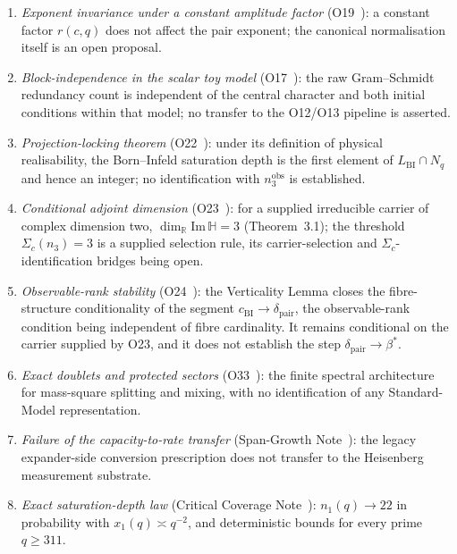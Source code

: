 \documentclass[11pt,a4paper]{article}
\theoremstyle{definition}
\renewcommand{\Im}{\mathrm{Im}\,}
\newcommand{\dimpair}{\delta_{\mathrm{pair}}}
\newcommand{\betastar}{\beta^*}
\newcommand{\cchi}{c_{\mathrm{BI}}}
\newcommand{\nobs}{n^{\mathrm{obs}}_3}
\begin{document}
\begin{enumerate}
        \item \textit{Exponent invariance under a constant amplitude factor} (O19~\cite{Beau2026a23}):
        a constant factor $r(c,q)$ does not affect the pair exponent; the canonical normalisation
        itself is an open proposal.

        \item \textit{Block-independence in the scalar toy model} (O17~\cite{Beau2026a21}): the
        raw Gram--Schmidt redundancy count is independent of the central character and both initial
        conditions within that model; no transfer to the O12/O13 pipeline is asserted.

        \item \textit{Projection-locking theorem} (O22~\cite{Beau2026a26}): under its definition of
        physical realisability, the Born--Infeld saturation depth is the first element of
        $L_{\mathrm{BI}} \cap N_q$ and hence an integer; no identification with $\nobs$ is established.

        \item \textit{Conditional adjoint dimension} (O23~\cite{Beau2026a27}): for a supplied
        irreducible carrier of complex dimension two,
        $\dim_\mathbb{R} \Im\mathbb{H} = 3$ (Theorem~3.1);
        the threshold $\Sigma_c(n_3) = 3$ is a supplied selection rule, its carrier-selection
        and $\Sigma_c$-identification bridges being open.

        \item \textit{Observable-rank stability} (O24~\cite{Beau2026a28}): the Verticality Lemma
        closes the fibre-structure conditionality of the segment $\cchi \to \dimpair$, the
        observable-rank condition being independent of fibre cardinality.
        It remains conditional on the carrier supplied by O23, and it does not establish the
        step $\dimpair \to \betastar$.

        \item \textit{Exact doublets and protected sectors} (O33~\cite{Beau2026a37}): the finite
        spectral architecture for mass-square splitting and mixing, with no identification of any
        Standard-Model representation.

        \item \textit{Failure of the capacity-to-rate transfer} (Span-Growth
        Note~\cite{Beau2026sgn}): the legacy expander-side conversion prescription does not transfer to the
        Heisenberg measurement substrate.

        \item \textit{Exact saturation-depth law} (Critical Coverage
        Note~\cite{Beau2026ccnote}): $n_1(q) \to 22$ in probability with
        $x_1(q) \asymp q^{-2}$, and deterministic bounds for every prime $q \geq 311$.


\end{enumerate}
\end{document}
